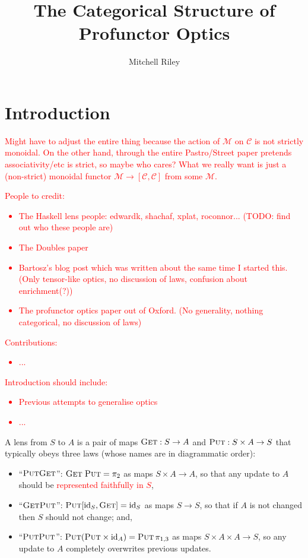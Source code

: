 \documentclass[11pt,a4paper]{article}
\title{The Categorical Structure of Profunctor Optics}
\author{Mitchell Riley}
\theoremstyle{plain}
\theoremstyle{definition}
\newcommand{\C}{\mathscr{C}}
\newcommand{\M}{\mathscr{M}}
\newcommand{\id}{\mathrm{id}}
\newcommand{\fget}{\textsc{Get}}
\newcommand{\fput}{\textsc{Put}}
\newcommand{\todo}[1]{\textcolor{red}{\small #1}}
\begin{document}
\maketitle

\section{Introduction}

\todo{Might have to adjust the entire thing because the action of $\M$ on $\C$ is not strictly monoidal. On the other hand, through the entire Pastro/Street paper pretends associativity/etc is strict, so maybe who cares? What we really want is just a (non-strict) monoidal functor $\M \to [\C, \C]$ from some $\M$.}

\todo{People to credit:
\begin{itemize}
\item The Haskell lens people: edwardk, shachaf, xplat, roconnor... (TODO: find out who these people are)
\item The Doubles paper
\item Bartosz's blog post which was written about the same time I started this. (Only tensor-like optics, no discussion of laws, confusion about enrichment(?))
\item The profunctor optics paper out of Oxford. (No generality, nothing categorical, no discussion of laws)
\end{itemize}
}

\todo{Contributions:
\begin{itemize}
\item ...
\end{itemize}
}

\todo{Introduction should include:
\begin{itemize}
\item Previous attempts to generalise optics
\item ...
\end{itemize}
}
A lens from $S$ to $A$ is a pair of maps $\fget : S \to A$ and $\fput : S \times A \to S$ that typically obeys three laws (whose names are in diagrammatic order):
\begin{itemize}
\item ``$\fput\fget$'': $\fget \; \fput = \pi_2$ as maps $S \times A \to A$, so that any update to $A$ should be \todo{represented faithfully in $S$},
\item ``$\fget\fput$'': $\fput [\id_S, \fget] = \id_S$ as maps $S \to S$, so that if $A$ is not changed then $S$ should not change; and,
\item ``$\fput\fput$'': $\fput (\fput \times \id_A) = \fput \, \pi_{1, 3}$ as maps $S \times A \times A \to S$, so any update to $A$ completely overwrites previous updates.
\end{itemize}
\end{document}
